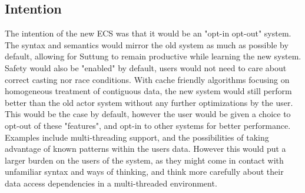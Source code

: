 \subsection{Intention}
The intention of the new ECS was that it would be an "opt-in opt-out" system.
The syntax and semantics would mirror the old system as much as possible by default,
allowing for Suttung to remain productive while learning the new system.
Safety would also be "enabled" by default, users would not need to care about correct casting
nor race conditions.
With cache friendly algorithms focusing on homogeneous treatment of contiguous data,
the new system would still perform better than the old actor system without any further optimizations by the user.
This would be the case by default, however the user would be given a choice to opt-out of these "features",
and opt-in to other systems for better performance.
Examples include multi-threading support, and the possibilities of taking advantage of known patterns within the users data.
However this would put a larger burden on the users of the system, as they might come in contact with unfamiliar syntax and ways of thinking,
and think more carefully about their data access dependencies in a multi-threaded environment.
